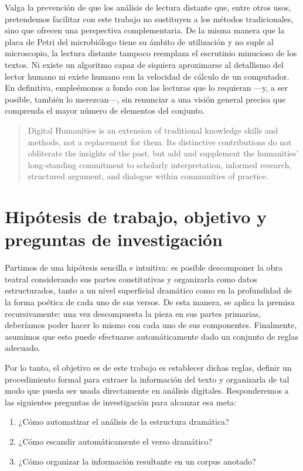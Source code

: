 Valga la prevención de que los análisis de lectura distante que, entre otros usos, pretendemos facilitar con este trabajo no sustituyen a los métodos tradicionales, sino que ofrecen una perspectiva complementaria. De la misma manera que la placa de Petri del microbiólogo tiene su ámbito de utilización y no suple al microscopio, la lectura distante tampoco reemplaza el escrutinio minucioso de los textos. Ni existe un algoritmo capaz de siquiera aproximarse al detallismo del lector humano ni existe humano con la velocidad de cálculo de un computador. En definitiva, empleémonos a  fondo con las lecturas que lo requieran —\nolinebreak y, a ser posible, también lo merezcan\nolinebreak—\nolinebreak, sin renunciar a una visión general precisa que comprenda el mayor número de elementos del conjunto.

\blockquote{\begin{english}Digital Humanities is an extension of traditional knowledge skills and methods, not a replacement for them. Its distinctive contributions do not obliterate the insights of the past, but add and supplement the humanities' long-standing commitment to scholarly interpretation, informed research, structured argument, and dialogue within communities of practice.\end{english} \parencite[16]{burdick2012}}.

\section{Hipótesis de trabajo, objetivo y preguntas de investigación}
Partimos de una hipótesis sencilla e intuitiva: es posible descomponer la obra teatral considerando sus partes constitutivas y organizarla como datos estructurados, tanto a un nivel superficial dramático como en la profundidad de la forma poética de cada uno de sus versos. De esta manera, se aplica la premisa recursivamente: una vez descompuesta la pieza en sus partes primarias, deberíamos poder hacer lo mismo con cada uno de sus componentes. Finalmente, asumimos que esto puede efectuarse automáticamente dado un conjunto de reglas adecuado.

Por lo tanto, el objetivo es de este trabajo es establecer dichas reglas, definir un procedimiento formal para extraer la información del texto y organizarla de tal modo que pueda ser usada directamente en análisis digitales. Responderemos a las siguientes preguntas de investigación para alcanzar esa meta:
\begin{enumerate}[label=\roman*.]
	\item¿Cómo automatizar el análisis de la estructura dramática?
	\item¿Cómo escandir automáticamente el verso dramático?
	\item¿Cómo organizar la información resultante en un corpus  anotado?
\end{enumerate}

